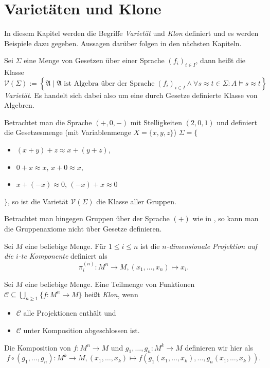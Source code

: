 \section{Varietäten und Klone}
In diesem Kapitel werden die Begriffe \emph{Varietät} und \emph{Klon} definiert und es werden Beispiele dazu gegeben. Aussagen darüber folgen in den nächsten Kapiteln.

\begin{definition}
    Sei $\Sigma$ eine Menge von Gesetzen über einer Sprache $(f_i)_{i \in I}$, dann heißt die Klasse
    $$ \mathcal{V}(\Sigma) := \left\{ \mathfrak{A} \mid \mathfrak{A} \;\text{ist Algebra über der Sprache}\; (f_i)_{i \in I} \land \forall s \approx t \in \Sigma: A\models s\approx t \right\} $$
    \emph{Varietät}. Es handelt sich dabei also um eine durch Gesetze definierte Klasse von Algebren.
\end{definition}

\begin{example}
    Betrachtet man die Sprache $(+, 0, -)$ mit Stelligkeiten $(2, 0, 1)$ und definiert die Gesetzesmenge (mit Variablenmenge $X = \{x,y,z\}$) $\Sigma = \{$
    \begin{itemize}[label={}]
        \item $(x + y) + z \approx x + (y + z)$,
        \item $0 + x \approx x$, $x + 0 \approx x$,
        \item $x + (-x) \approx 0$, $(-x) + x \approx 0$
    \end{itemize}
    $\}$, so ist die Varietät $\mathcal{V}(\Sigma)$ die Klasse aller Gruppen.
    
    Betrachtet man hingegen Gruppen über der Sprache $(+)$ wie in , so kann man die Gruppenaxiome nicht über Gesetze definieren.
\end{example}

\begin{definition}
    Sei $M$ eine beliebige Menge. Für $1 \le i \le n$ ist die \emph{$n$-dimensionale Projektion auf die $i$-te Komponente} definiert als
    $$ \pi_i^{(n)}: M^n \to M, (x_1, \ldots, x_n) \mapsto x_i. $$
\end{definition}

\begin{definition}
    Sei $M$ eine beliebige Menge. Eine Teilmenge von Funktionen $\mathcal{C} \subseteq \bigcup_{n \ge 1} \{f: M^n \to M\}$ heißt \emph{Klon}, wenn 
    \begin{itemize}
        \item $\mathcal{C}$ alle Projektionen enthält und
        \item $\mathcal{C}$ unter Komposition abgeschlossen ist.
    \end{itemize}

    Die Komposition von $f: M^n \to M$ und $g_1, \ldots, g_n: M^k \to M$ definieren wir hier als 
    $$ f \circ (g_1, \ldots, g_n): M^k \to M, (x_1, \ldots, x_k) \mapsto f(g_1(x_1, \ldots, x_k), \ldots, g_n(x_1, \ldots, x_k)).$$
\end{definition}

